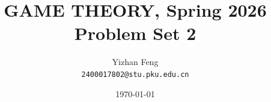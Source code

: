 \title{\textbf{GAME THEORY, Spring 2026} \\[0.5em]
    \Large Problem Set 2}
\author{Yizhan Feng \\ 
    \normalsize{\texttt{2400017802@stu.pku.edu.cn}}}
\date{\today}